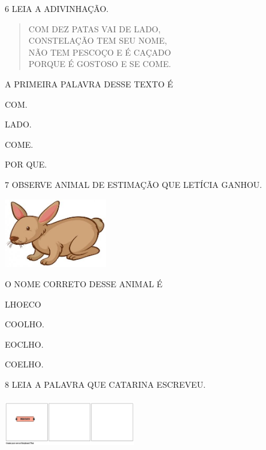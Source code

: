 \num{6} LEIA A ADIVINHAÇÃO. 

\begin{verse}
COM DEZ PATAS VAI DE LADO,\\
CONSTELAÇÃO TEM SEU NOME,\\
NÃO TEM PESCOÇO E É CAÇADO\\
PORQUE É GOSTOSO E SE COME.
\end{verse}


A PRIMEIRA PALAVRA DESSE TEXTO É

\begin{escolha}
\item COM.

\item LADO.

\item COME.

\item POR QUE.
\end{escolha}

\num{7} OBSERVE ANIMAL DE ESTIMAÇÃO QUE LETÍCIA GANHOU.

\includegraphics[width=1.75903in,height=1.18611in]{media/image246.jpg}

O NOME CORRETO DESSE ANIMAL É

\begin{escolha}
\item LHOECO

\item COOLHO.

\item EOCLHO.

\item COELHO.
\end{escolha}

\num{8} LEIA A PALAVRA QUE CATARINA ESCREVEU.

\includegraphics[width=2.25361in,height=0.86599in]{media/image247.png}

